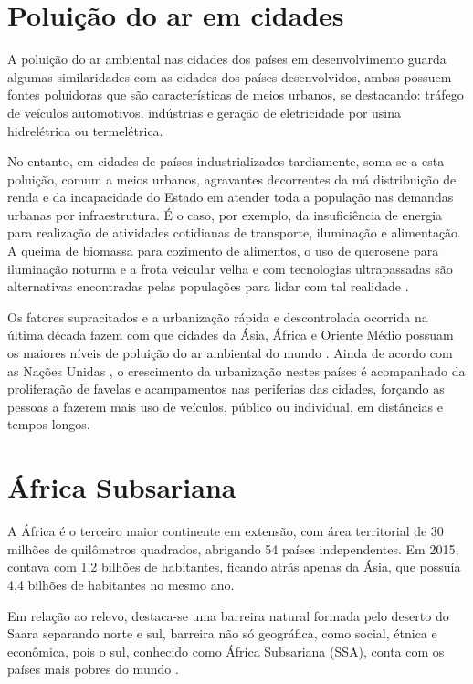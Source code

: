 \section{Poluição do ar em cidades}

A poluição do ar ambiental nas cidades dos países em desenvolvimento
guarda algumas similaridades com as cidades dos países desenvolvidos,
ambas possuem fontes poluidoras que são características de meios urbanos, 
se destacando: tráfego de veículos automotivos, indústrias e geração de
eletricidade por usina hidrelétrica ou termelétrica.

No entanto, em cidades de países industrializados tardiamente, soma-se a esta 
poluição, comum a meios urbanos, agravantes decorrentes da má distribuição de 
renda e da incapacidade do Estado em atender toda a população nas demandas urbanas 
por infraestrutura. É o caso, por exemplo, da insuficiência de energia para 
realização de atividades cotidianas de transporte, iluminação e alimentação. 
A queima de biomassa para cozimento de alimentos, o uso de querosene para 
iluminação noturna e a frota veicular velha e com tecnologias 
ultrapassadas são alternativas encontradas pelas populações para lidar 
com tal realidade \citep{brauer2012}.

Os fatores supracitados e a urbanização rápida e descontrolada ocorrida na
última década fazem com que cidades da Ásia, África e Oriente 
Médio possuam os maiores níveis de poluição do ar ambiental do mundo 
\citep{brauer2012}. Ainda de acordo com as Nações Unidas \citeyearpar{UN}, 
o crescimento da urbanização nestes países é acompanhado da proliferação de 
favelas e acampamentos nas periferias das cidades, forçando as pessoas a 
fazerem mais uso de veículos, público ou individual, em distâncias e 
tempos longos. 
	
\section{África Subsariana}

A África é o terceiro maior continente em extensão, com área territorial 
de 30 milhões de quilômetros quadrados, abrigando 54 países independentes. 
Em 2015, contava com 1,2 bilhões de habitantes, ficando atrás 
apenas da Ásia, que possuía 4,4 bilhões de habitantes no mesmo ano.
 
Em relação ao relevo, destaca-se uma barreira natural formada pelo deserto do 
Saara separando norte e sul, barreira não só geográfica, como social, étnica 
e econômica, pois o sul, conhecido como África Subsariana (SSA), 
conta com os países mais pobres do mundo \citep{UN}. 

